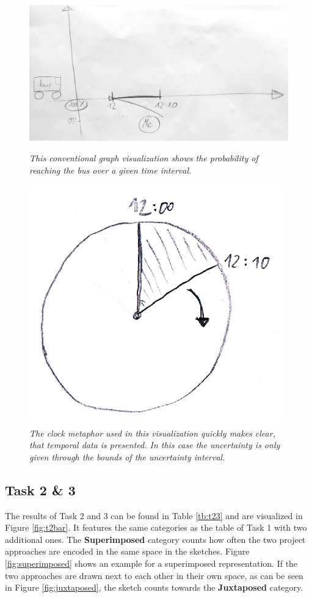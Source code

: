 \begin{itemize}
	\begin{figure}[H]
		\begin{minipage}{.5\textwidth}
			\centering
			\captionsetup{width=0.8\textwidth}
			\includegraphics[height=0.5\textwidth]{figures/graph.jpg}
			\caption{\textit{This conventional graph visualization shows the probability of reaching the bus over a given time interval.}}
			\label{fig:graph}
		\end{minipage}
		\begin{minipage}{.45\textwidth}
			\centering
			\captionsetup{width=1.0\textwidth}
			\includegraphics[height=0.5\textwidth]{figures/clock.png}
			\caption{\textit{The clock metaphor used in this visualization quickly makes clear, that temporal data is presented. In this case the uncertainty is only given through the bounds of the uncertainty interval.}}
			\label{fig:clock}
		\end{minipage}
	\end{figure}
\end{itemize}


\subsection*{Task 2 \& 3}
The results of Task 2 and 3 can be found in Table \ref{tb:t23} and are visualized in Figure \ref{fig:t2bar}. It features the same categories as the table of Task 1 with two additional ones. The \textbf{Superimposed} category counts how often the two project approaches are encoded in the same space in the sketches. Figure \ref{fig:superimposed} shows an example for a superimposed representation. If the two approaches are drawn next to each other in their own space, as can be seen in Figure \ref{fig:juxtaposed}, the sketch counts towards the \textbf{Juxtaposed} category.

